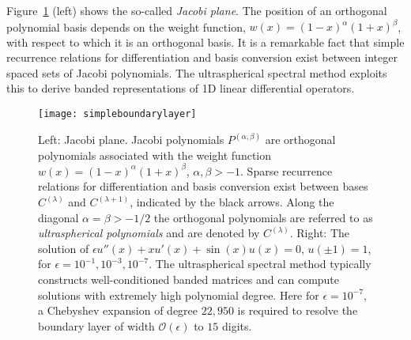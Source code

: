 \documentclass[review]{siamart171218}
\begin{document}
Figure~\ref{fig:JacobiPlane} (left) shows the so-called {\em Jacobi plane}. The position of an orthogonal polynomial basis depends on the weight function, $w(x) = (1-x)^\alpha(1+x)^\beta$, with respect to which it is an orthogonal basis.  It is a remarkable fact that simple recurrence relations for differentiation and basis conversion exist between integer spaced sets of Jacobi polynomials. The ultraspherical spectral method exploits this to derive banded representations of 1D linear differential operators. 

\begin{figure}
 \centering 
 \begin{minipage}{.49\textwidth}
   \centering
  \end{minipage}
\begin{minipage}{.49\textwidth}
\texttt{[image: simpleboundarylayer]}
\end{minipage}
  \caption{Left: Jacobi plane. Jacobi polynomials $P^{(\alpha,\beta)}$ are orthogonal polynomials associated with the weight function $w(x) = (1-x)^\alpha(1+x)^\beta$, $\alpha,\beta>-1$. Sparse recurrence relations for differentiation and basis conversion exist between bases $C^{(\lambda)}$ and $C^{(\lambda+1)}$, indicated by the black arrows. Along the diagonal $\alpha=\beta>-1/2$ the orthogonal polynomials are referred to as {\em ultraspherical polynomials} and are denoted by $C^{(\lambda)}$. Right: The solution of $\epsilon u''(x) + xu'(x)+\sin(x)u(x) = 0$, $u(\pm 1) = 1$, for $\epsilon = 10^{-1}, 10^{-3}, 10^{-7}$. The ultraspherical spectral method typically constructs well-conditioned banded matrices and can compute solutions with extremely high polynomial degree. Here for $\epsilon=10^{-7}$, a Chebyshev expansion of degree $22,\!950$ is required to resolve the boundary layer of width $\mathcal{O}(\epsilon)$ to $15$ digits.}
  \label{fig:JacobiPlane}
\end{figure}
\end{document}
